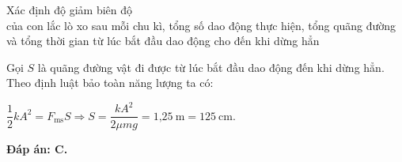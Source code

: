 \begin{dang}{Xác định  độ giảm biên độ\\ của con lắc lò xo sau mỗi chu kì, tổng số dao động thực hiện, tổng quãng đường\\ và tổng thời gian từ lúc bắt đầu dao động cho đến khi dừng hẳn}
{		Gọi $S$ là quãng đường vật đi được từ lúc bắt đầu dao động đến khi dừng hẳn.
		Theo định luật bảo toàn năng lượng ta có:
		
		$\dfrac{1}{2}kA^2=F_\text{ms}S\Rightarrow S=\dfrac{kA^2}{2\mu mg}=\text{1,25}\ \text{m}=\text{125}\ \text{cm}$.
		
		\textbf{Đáp án: C.}
	}
	
	
\end{dang}
